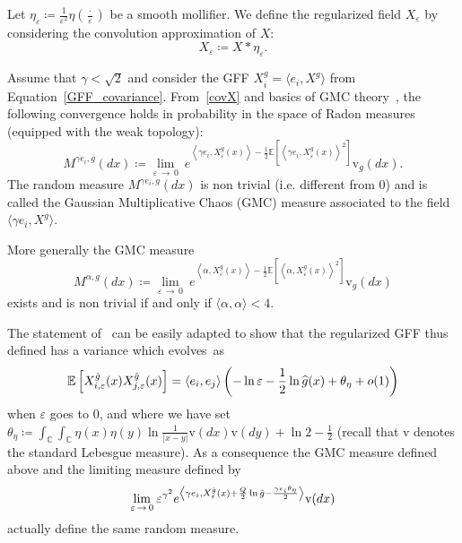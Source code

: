\documentclass[AHL,Unicode,longabstracts,published]{cedram}
\newcommand{\rmv}{\mathrm{v}}
\newcommand{\C}{\mathbb{C}}
\newcommand{\ps}[1]{\langle #1 \rangle}
\newcommand*\eps{\varepsilon}
\newcommand{\norm}[1]{\left\lvert#1\right\rvert}
\newcommand{\expect}[1]{\mathbb{E}\left[#1\right]}
\let\oldhat\hat
\renewcommand*{\hat}[1]{\mathchoice{\widehat{#1}}{\widehat{#1}}{\oldhat{#1}}{\oldhat{#1}}}
\begin{document}
\begin{defi}
Let $\eta_\eps\coloneqq \frac1{\eps^2}\eta(\frac{\cdot}{\eps})$ be a smooth mollifier. We define the regularized field $X_\eps$ by considering the convolution approximation of $X$:
\begin{equation}
X_\eps\coloneqq X*\eta_\eps.
\end{equation}
\end{defi}

\begin{defi}
Assume that $\gamma<\sqrt 2$ and consider the GFF $X^g_i=\langle e_i, X^{g} \rangle$ from Equation~\eqref{GFF_covariance}. From~\eqref{covX} and basics of GMC theory~\cite{review}, the following convergence holds in probability in the space of Radon measures (equipped with the weak topology):
\begin{equation}
M^{\gamma e_i, g}(dx)\coloneqq \underset{\eps \,\to\,0}{\lim} \: e^{\left\langle\gamma e_i, X^{g}_\eps(x)\right\rangle-\frac12\expect{\left\langle\gamma e_i, X^{g}_\eps(x)\right\rangle^2}} \rmv_{g}(dx).
\end{equation}
The random measure $M^{\gamma e_i,g}(dx) $ is non trivial (i.e. different from $0$) and is called the Gaussian Multiplicative Chaos (GMC) measure associated to the field $\langle\gamma e_i, X^{g} \rangle$.
\end{defi}

More generally the GMC measure
\begin{equation*}
M^{\alpha,g}(dx)\coloneqq \underset{\eps\,\to\,0}{\lim} \: e^{\left\langle\alpha, X^{g}_\eps(x) \right\rangle-\frac12\expect{\left\langle\alpha, X^{g}_\eps(x)\right\rangle^2}} \rmv_g(dx)
\end{equation*}
exists and is non trivial if and only if $\ps{\alpha,\alpha}< 4$.

\begin{rema}
The statement of~\cite[Proposition~(2.5)]{DKRV} can be easily adapted to show that the regularized GFF thus defined has a variance which evolves~as
\[
\expect{X^{\hat g}_{i, \eps}(x)X^{\hat g}_{j, \eps}(x)}=\ps{e_i,e_j}\left(-\ln\eps-\frac12\ln\hat g(x)+\theta_{\eta}+o(1)\right)
\]
when $\eps$ goes to $0$, and where we have set $\theta_{\eta}\coloneqq \int_\C\int_\C\eta(x)\eta(y)\ln\frac{1}{\norm{x-y}}\rmv(dx)\rmv(dy)+\ln 2-\frac12$ (recall that $\rmv$ denotes the standard Lebesgue measure). As a consequence the GMC measure defined above and the limiting measure defined by
\[
\underset{\eps\,\to\,0}{\lim} \: \eps^{\gamma^2}e^{\left\langle\gamma e_i, X^{\hat g}_\eps(x) +\frac Q2\ln\hat g-\frac{\gamma e_i\theta_{\eta}}2 \right\rangle}\rmv(dx)
\]
actually define the same random measure.
\end{rema}
\end{document}
